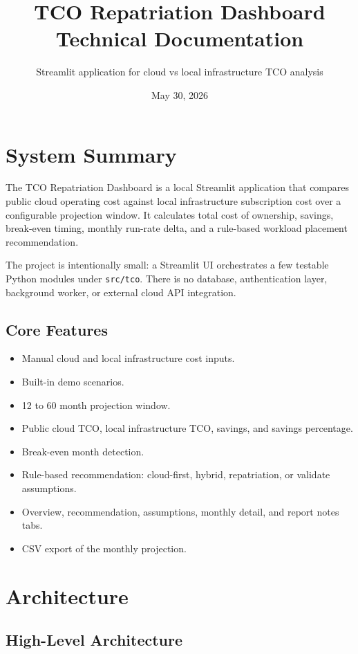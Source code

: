 \documentclass[11pt,a4paper]{article}
\title{TCO Repatriation Dashboard\\Technical Documentation}
\author{Streamlit application for cloud vs local infrastructure TCO analysis}
\date{May 30, 2026}
\begin{document}
\maketitle
\tableofcontents
\newpage

\section{System Summary}

The TCO Repatriation Dashboard is a local Streamlit application that compares public cloud operating cost against local infrastructure subscription cost over a configurable projection window. It calculates total cost of ownership, savings, break-even timing, monthly run-rate delta, and a rule-based workload placement recommendation.

The project is intentionally small: a Streamlit UI orchestrates a few testable Python modules under \texttt{src/tco}. There is no database, authentication layer, background worker, or external cloud API integration.

\subsection{Core Features}

\begin{itemize}
  \item Manual cloud and local infrastructure cost inputs.
  \item Built-in demo scenarios.
  \item 12 to 60 month projection window.
  \item Public cloud TCO, local infrastructure TCO, savings, and savings percentage.
  \item Break-even month detection.
  \item Rule-based recommendation: cloud-first, hybrid, repatriation, or validate assumptions.
  \item Overview, recommendation, assumptions, monthly detail, and report notes tabs.
  \item CSV export of the monthly projection.
\end{itemize}

\section{Architecture}

\subsection{High-Level Architecture}
\end{document}

